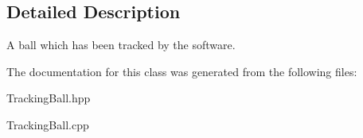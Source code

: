 \subsection{Detailed Description}
A ball which has been tracked by the software. 

The documentation for this class was generated from the following files\+:\begin{DoxyCompactItemize}
\item 
Tracking\+Ball.\+hpp\item 
Tracking\+Ball.\+cpp\end{DoxyCompactItemize}
